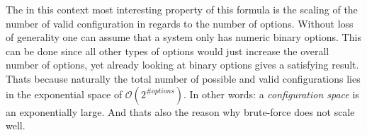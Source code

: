 The in this context most interesting property of this formula is the scaling of the number of valid configuration in regards to the number of options. Without loss of generality one can assume that a system only has numeric binary options. This can be done since all other types of options would just increase the overall number of options, yet already looking at binary options gives a satisfying result. Thats because naturally the total number of possible and valid configurations lies in the exponential space of $\mathcal{O}(2^{\#options})$. In other words: a \textit{configuration space} is an exponentially large. And thats also the reason why brute-force does not scale well.


